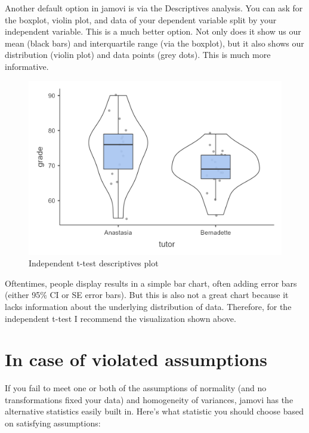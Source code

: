 \documentclass[
]{book}
\begin{document}
Another default option in jamovi is via the Descriptives analysis. You can ask for the boxplot, violin plot, and data of your dependent variable split by your independent variable. This is a much better option. Not only does it show us our mean (black bars) and interquartile range (via the boxplot), but it also shows our distribution (violin plot) and data points (grey dots). This is much more informative.

\begin{figure}

{\centering \includegraphics[width=1\linewidth]{images/02-independent_t-test/independent_t-test_plot} 

}

\caption{Independent t-test descriptives plot}\label{fig:unnamed-chunk-10}
\end{figure}

Oftentimes, people display results in a simple bar chart, often adding error bars (either 95\% CI or SE error bars). But this is also not a great chart because it lacks information about the underlying distribution of data. Therefore, for the independent t-test I recommend the visualization shown above.

\hypertarget{in-case-of-violated-assumptions}{%
\section{In case of violated assumptions}\label{in-case-of-violated-assumptions}}

If you fail to meet one or both of the assumptions of normality (and no transformations fixed your data) and homogeneity of variances, jamovi has the alternative statistics easily built in. Here's what statistic you should choose based on satisfying assumptions:
\end{document}
